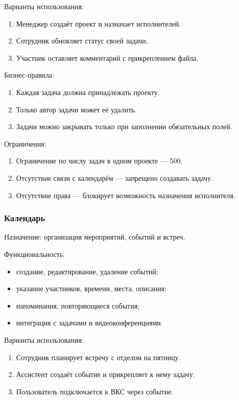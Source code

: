 Варианты использования:
\begin{enumerate}
  \item Менеджер создаёт проект и назначает исполнителей.
  \item Сотрудник обновляет статус своей задачи.
  \item Участник оставляет комментарий с прикреплением файла.
\end{enumerate}

Бизнес-правила:
\begin{enumerate}
  \item Каждая задача должна принадлежать проекту.
  \item Только автор задачи может её удалить.
  \item Задачи можно закрывать только при заполнении обязательных полей.
\end{enumerate}

Ограничения:
\begin{enumerate}
  \item Ограничение по числу задач в одном проекте — 500.
  \item Отсутствие связи с календарём — запрещено создавать задачу.
  \item Отсутствие права — блокирует возможность назначения исполнителя.
\end{enumerate}

\subsubsection{Календарь}

Назначение: организация мероприятий, событий и встреч.

Функциональность:
\begin{itemize}
  \item создание, редактирование, удаление событий;
  \item указание участников, времени, места, описания;
  \item напоминания, повторяющиеся события;
  \item интеграция с задачами и видеоконференциями.
\end{itemize}

Варианты использования:
\begin{enumerate}
  \item Сотрудник планирует встречу с отделом на пятницу.
  \item Ассистент создаёт событие и прикрепляет к нему задачу.
  \item Пользователь подключается к ВКС через событие.
\end{enumerate}


